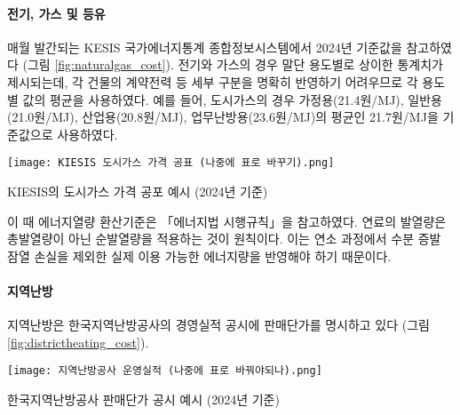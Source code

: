 \paragraph{전기, 가스 및 등유} 매월 발간되는 KESIS 국가에너지통계 종합정보시스템에서 2024년 기준값을 참고하였다 (그림 \ref{fig:naturalgas_cost}). 전기와 가스의 경우 말단 용도별로 상이한 통계치가 제시되는데, 각 건물의 계약전력 등 세부 구분을 명확히 반영하기 어려우므로 각 용도별 값의 평균을 사용하였다. 예를 들어, 도시가스의 경우 가정용(21.4원/MJ), 일반용(21.0원/MJ), 산업용(20.8원/MJ), 업무난방용(23.6원/MJ)의 평균인 21.7원/MJ을 기준값으로 사용하였다.

\begin{defaultfigure}
  \texttt{[image: KIESIS 도시가스 가격 공표 (나중에 표로 바꾸기).png]}
  \caption{KIESIS의 도시가스 가격 공포 예시 (2024년 기준)}
  \label{fig:naturalgas_cost}
\end{defaultfigure}

이 때 에너지열량 환산기준은 「에너지법 시행규칙」을 참고하였다. 연료의 발열량은 총발열량이 아닌 순발열량을 적용하는 것이 원칙이다. 이는 연소 과정에서 수분 증발 잠열 손실을 제외한 실제 이용 가능한 에너지량을 반영해야 하기 때문이다.


\paragraph{지역난방} 지역난방은 한국지역난방공사의 경영실적 공시에 판매단가를 명시하고 있다 (그림 \ref{fig:districtheating_cost}).

\begin{defaultfigure}
  \texttt{[image: 지역난방공사 운영실적 (나중에 표로 바꿔야되나).png]}
  \caption{한국지역난방공사 판매단가 공시 예시 (2024년 기준)}
  \label{fig:districtheating_cost}
\end{defaultfigure}
